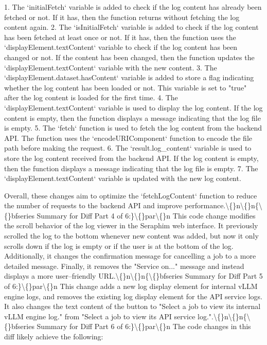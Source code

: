\documentclass{article}
\begin{document}
{1. The `initialFetch` variable is added to check if the log content has already been fetched or not. If it has, then the function returns without fetching the log content again.
2. The `isInitialFetch` variable is added to check if the log content has been fetched at least once or not. If it has, then the function uses the `displayElement.textContent` variable to check if the log content has been changed or not. If the content has been changed, then the function updates the `displayElement.textContent` variable with the new content.
3. The `displayElement.dataset.hasContent` variable is added to store a flag indicating whether the log content has been loaded or not. This variable is set to "true" after the log content is loaded for the first time.
4. The `displayElement.textContent` variable is used to display the log content. If the log content is empty, then the function displays a message indicating that the log file is empty.
5. The `fetch` function is used to fetch the log content from the backend API. The function uses the `encodeURIComponent` function to encode the file path before making the request.
6. The `result.log\_content` variable is used to store the log content received from the backend API. If the log content is empty, then the function displays a message indicating that the log file is empty.
7. The `displayElement.textContent` variable is updated with the new log content.

Overall, these changes aim to optimize the `fetchLogContent` function to reduce the number of requests to the backend API and improve performance.\textbackslash\{\}n\textbackslash\{\}n\{\textbackslash\{\}bfseries Summary for Diff Part 4 of 6:\}\textbackslash\{\}par\textbackslash\{\}n  This code change modifies the scroll behavior of the log viewer in the Seraphim web interface. It previously scrolled the log to the bottom whenever new content was added, but now it only scrolls down if the log is empty or if the user is at the bottom of the log. Additionally, it changes the confirmation message for cancelling a job to a more detailed message. Finally, it removes the "Service on..." message and instead displays a more user--friendly URL.\textbackslash\{\}n\textbackslash\{\}n\{\textbackslash\{\}bfseries Summary for Diff Part 5 of 6:\}\textbackslash\{\}par\textbackslash\{\}n  This change adds a new log display element for internal vLLM engine logs, and removes the existing log display element for the API service logs. It also changes the text content of the button to "Select a job to view its internal vLLM engine log." from "Select a job to view its API service log.".\textbackslash\{\}n\textbackslash\{\}n\{\textbackslash\{\}bfseries Summary for Diff Part 6 of 6:\}\textbackslash\{\}par\textbackslash\{\}n  The code changes in this diff likely achieve the following:

}
\end{document}
